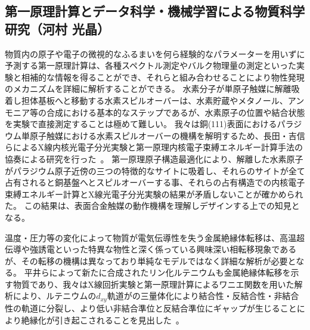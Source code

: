 \subsection{第一原理計算とデータ科学・機械学習による物質科学研究（河村 光晶）}

物質内の原子や電子の微視的なふるまいを何ら経験的なパラメーターを用いずに予測する第一原理計算は、各種スペクトル測定やバルク物理量の測定といった実験と相補的な情報を得ることができ、それらと組み合わせることにより物性発現のメカニズムを詳細に解析することができる。
%
水素分子が単原子触媒に解離吸着し担体基板へと移動する水素スピルオーバーは、水素貯蔵やメタノール、アンモニア等の合成における基本的なステップであるが、水素原子の位置や結合状態を実験で直接測定することは極めて難しい。
我々は銅(111)表面におけるパラジウム単原子触媒における水素スピルオーバーの機構を解明するため、長田・吉信らによるX線内核光電子分光実験と第一原理内核電子束縛エネルギー計算手法の協奏による研究を行った~\cite{osada.pccp.24.21705}。
第一原理原子構造最適化により、解離した水素原子がパラジウム原子近傍の三つの特徴的なサイトに吸着し、それらのサイトが全て占有されると銅基盤へとスピルオーバーする事、それらの占有構造での内核電子束縛エネルギー計算とX線光電子分光実験の結果が矛盾しないことが確かめられた。
この結果は、表面合金触媒の動作機構を理解しデザインする上での知見となる。

温度・圧力等の変化によって物質が電気伝導性を失う金属絶縁体転移は、高温超伝導や強誘電といった特異な物性と深く係っている興味深い相転移現象であるが、その転移の機構は異なっており単純なモデルではなく詳細な解析が必要となる。
平井らによって新たに合成されたリン化ルテニウムも金属絶縁体転移を示す物質であり、我々はX線回折実験と第一原理計算によるワニエ関数を用いた解析により、ルテニウムの$d_{xy}$軌道がの三量体化により結合性・反結合性・非結合性の軌道に分裂し、より低い非結合準位と反結合準位にギャップが生じることにより絶縁化が引き起こされることを見出した~\cite{hirai.jacs.144.17857}。

